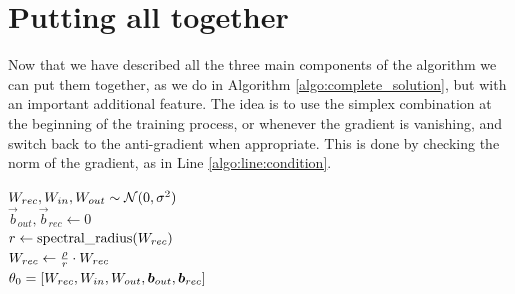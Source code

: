 \section{Putting all together}
Now that we have described all the three main components of the algorithm we can put them together, as we do in Algorithm \ref{algo:complete_solution}, but with an important additional feature. The idea is to use the simplex combination at the beginning of the training process, or whenever the gradient is vanishing, and switch back to the anti-gradient when appropriate. This is done by checking the norm of the gradient, as in Line \ref{algo:line:condition}.


\begin{algorithm}[]
	
	\BlankLine
	
	$W_{rec}, W_{in}, W_{out} \sim \mathcal{N}(0, \sigma^2)$\\
	$\vec{b}_{out}, \vec{b}_{rec} \gets 0$\\
	$r \gets \mbox{spectral\_radius}(W_{rec})$\\
	$W_{rec}\gets \frac{\rho}{r} \cdot W_{rec}$\\
	$\theta_0 = [W_{rec}, W_{in}, W_{out},\boldsymbol{b}_{out}, \boldsymbol{b}_{rec}]$

	
	\BlankLine
\end{algorithm}
